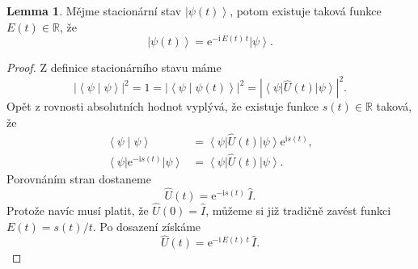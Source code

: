 \documentclass[10pt,a4paper]{report}
\theoremstyle{definition}
\newtheorem{lemma}[theorem]{Lemma}
\newcommand{\const}[1]{\mathrm{#1}}
\newcommand{\abs}[1]{\left| #1 \right|}
\newcommand{\bra}[1]{\left< #1 \right|}
\newcommand{\ket}[1]{\left| #1 \right>}
\newcommand{\braket}[2]{\left< #1 \middle| #2 \right>}
\newcommand{\e}[1]{\const{e}^{#1}}
\newcommand{\I}{\const{i}}
\def\R{\mathbb{R}}
\def\1{\hat{I}}
\begin{document}
\begin{lemma}
    Mějme stacionární stav $\ket{\psi(t)}$, potom existuje taková funkce $E(t) \in \R$, že
    \begin{equation*}
        \ket{\psi(t)} = \e{-\I \, E(t) \, t} \ket{\psi}.
    \end{equation*}
\end{lemma}
\begin{proof}
    Z definice stacionárního stavu máme
    \begin{equation*}
        \abs{\braket{\psi}{\psi}}^2
        = 1
        = \abs{\braket{\psi}{\psi(t)}}^2
        = \abs{\bra{\psi} \hat{U}(t) \ket{\psi}}^2.
    \end{equation*}
    Opět z rovnosti absolutních hodnot vyplývá, že existuje funkce $s(t) \in \R$ taková, že
    \begin{align*}
        \braket{\psi}{\psi}
        &= \bra{\psi} \hat{U}(t) \ket{\psi} \e{\I s(t)},
        \\
        \bra{\psi} \e{-\I s(t)} \ket{\psi}
        &= \bra{\psi} \hat{U}(t) \ket{\psi}.
    \end{align*}
    Porovnáním stran dostaneme
    \begin{equation*}
        \hat U(t) = \e{-\I s(t)} \, \1.
    \end{equation*}
    Protože navíc musí platit, že $\hat U(0) = \1$, můžeme si již tradičně zavést funkci $E(t) = s(t) / t$. Po dosazení získáme
    \begin{equation*}
        \hat{U}(t) = \e{-\I \, E(t) \, t} \, \1.
    \end{equation*}
\end{proof}
\end{document}
